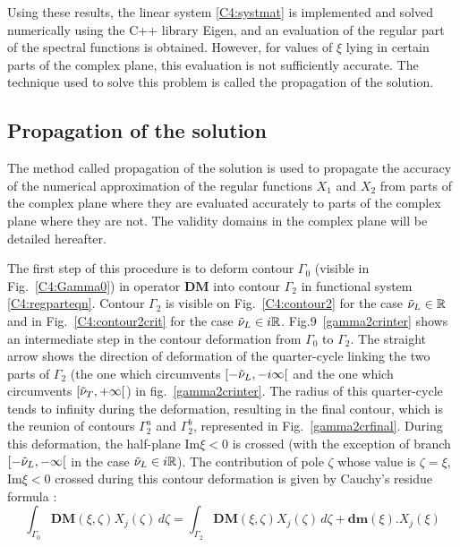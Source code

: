 Using these results, the linear system \eqref{C4:systmat} is implemented and solved numerically using the C++ library Eigen, and an evaluation of the regular part of the spectral functions is obtained. However, for values of $\xi$ lying in certain parts of the complex plane, this evaluation is not sufficiently accurate. The technique used to solve this problem is called the propagation of the solution.
 
\subsection{Propagation of the solution}
\label{C4:propag}
The method called propagation of the solution is used to propagate the accuracy of the numerical approximation of the regular functions $X_1$ and $X_2$ from parts of the complex plane where they are evaluated accurately to parts of the complex plane where they are not. The validity domains in the complex plane will be detailed hereafter.

The first step of this procedure is to deform contour $\Gamma_0$ (visible in Fig.~\ref{C4:Gamma0}) in operator $\mathbf{DM}$ into contour $\Gamma_2$ in functional system \eqref{C4:regparteqn}. Contour $\Gamma_2$ is visible on Fig.~\ref{C4:contour2} for the case $\tilde{\nu}_L \in \mathbb{R}$ and in Fig.~\ref{C4:contour2crit} for the case $\tilde{\nu}_L \in i\mathbb{R}$. Fig.9~\ref{gamma2crinter} shows an intermediate step in the contour deformation from $\Gamma_0$ to $\Gamma_2$. The straight arrow shows the direction of deformation of the quarter-cycle linking the two parts of $\Gamma_2$ (the one which circumvents $\lbrack -\tilde{\nu}_L,-i\infty \lbrack $ and the one which circumvents $\lbrack \tilde{\nu}_T, +\infty \lbrack$) in fig.~\ref{gamma2crinter}. The radius of this quarter-cycle tends to infinity during the deformation, resulting in the final contour, which is the reunion of contours $\Gamma_2^a$ and $\Gamma_2^b$, represented in Fig.~\ref{gamma2crfinal}. During this deformation, the half-plane Im$\xi<0$ is crossed (with the exception of branch $\lbrack -\tilde{\nu}_L,-\infty \lbrack$ in the case $\tilde{\nu}_L \in i\mathbb{R}$). The contribution of pole $\zeta$ whose value is $\zeta=\xi$, Im$\xi<0$ crossed during this contour deformation is given by Cauchy's residue formula :
\begin{equation}
\int_{\Gamma_0} \textbf{DM}(\xi,\zeta)X_j(\zeta)\, d\zeta = \int_{\Gamma_2}  \textbf{DM}(\xi,\zeta)X_j(\zeta)\, d\zeta + \textbf{dm}(\xi).X_j(\xi)
\label{C4:DM2}
\end{equation}

